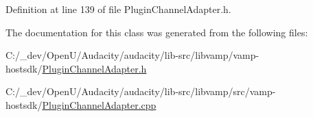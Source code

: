 Definition at line 139 of file Plugin\+Channel\+Adapter.\+h.



The documentation for this class was generated from the following files\+:\begin{DoxyCompactItemize}
\item 
C\+:/\+\_\+dev/\+Open\+U/\+Audacity/audacity/lib-\/src/libvamp/vamp-\/hostsdk/\hyperlink{_plugin_channel_adapter_8h}{Plugin\+Channel\+Adapter.\+h}\item 
C\+:/\+\_\+dev/\+Open\+U/\+Audacity/audacity/lib-\/src/libvamp/src/vamp-\/hostsdk/\hyperlink{_plugin_channel_adapter_8cpp}{Plugin\+Channel\+Adapter.\+cpp}\end{DoxyCompactItemize}
